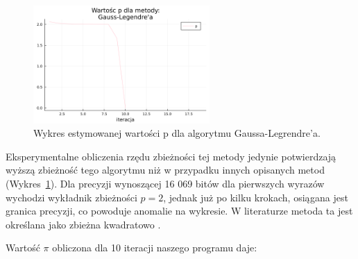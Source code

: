 \begin{figure}[!h]
    \centering
    \renewcommand{\figurename}{Wykres}
    \includegraphics[width=0.6\textwidth]{../prog/gauss_legendre_error_ratio.png}
    \caption{Wykres estymowanej wartości p dla algorytmu Gaussa-Legrendre'a.}
    \label{gauss-convergence}
\end{figure}

Eksperymentalne obliczenia rzędu zbieżności tej metody jedynie potwierdzają wyższą zbieżność tego algorytmu niż w przypadku innych opisanych metod (Wykres~\ref{gauss-convergence}). Dla precyzji wynoszącej 16 069 bitów dla pierwszych wyrazów wychodzi wykładnik zbieżności $p = 2$, jednak już po kilku krokach, osiągana jest granica precyzji, co powoduje anomalie na wykresie. W literaturze metoda ta jest określana jako zbieżna kwadratowo \cite{gausse-smth}.


\newpage

Wartość $\pi$ obliczona dla 10 iteracji naszego programu daje:

